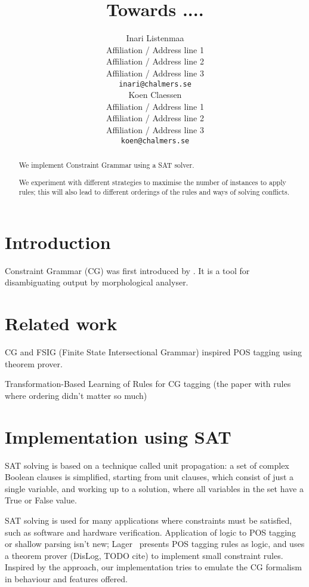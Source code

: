 \documentclass[11pt]{article}
\title{Towards ....}
\author{Inari Listenmaa \\
  Affiliation / Address line 1 \\
  Affiliation / Address line 2 \\
  Affiliation / Address line 3 \\
  {\tt inari@chalmers.se} \\\And
  Koen Claessen \\
  Affiliation / Address line 1 \\
  Affiliation / Address line 2 \\
  Affiliation / Address line 3 \\
  {\tt koen@chalmers.se} \\}
\date{}
\begin{document}
\maketitle
\begin{abstract}
We implement Constraint Grammar using a SAT solver.

We experiment with different strategies to maximise the number of instances to apply rules;
this will also lead to different orderings of the rules and ways of solving conflicts.


\end{abstract}


\section{Introduction}
Constraint Grammar (CG) was first introduced by \cite{KarlssonTODO}. 
It is a tool for disambiguating output by morphological analyser.


\section{Related work}
\label{sect:related}

\cite{lager1998, lager2000}  CG and FSIG (Finite State Intersectional Grammar) inspired POS tagging using theorem prover.

Transformation-Based Learning of Rules for CG tagging (the paper with rules where ordering didn't matter so much)



\section{Implementation using SAT}
\label{sect:pdf}

SAT solving is based on a technique called unit propagation:
a set of complex Boolean clauses is simplified, starting from unit
clauses, which consist of just a single variable, and working up to a
solution, where all variables in the set have a True or False value.

SAT solving is used for many applications where constraints must be
satisfied, such as software and hardware verification.
Application of logic to POS tagging or shallow parsing isn't new;
Lager~ presents POS tagging rules as logic, and uses
a theorem prover (DisLog, TODO cite) to implement small constraint rules.
Inspired by the approach, our implementation tries to emulate the CG
formalism in behaviour and features offered.
\end{document}
